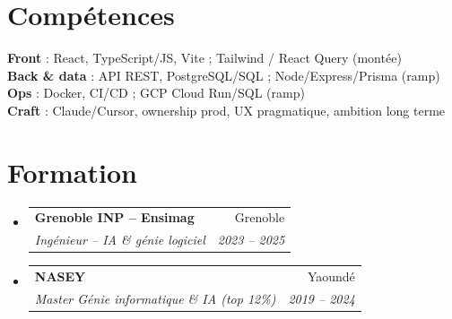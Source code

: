 \documentclass[a4paper,10.5pt]{article}
\makeatletter
\newcommand{\resumeSubheading}[4]{\vspace{2.5pt}\item\begin{tabular*}{0.97\textwidth}[t]{l@{\extracolsep{\fill}}r}\textbf{#1}&{#2}\\\textit{\small #3}&\textit{\small #4}\\\end{tabular*}\vspace{1pt}}
\newcommand{\resumeSubHeadingListStart}{\begin{itemize}[leftmargin=0.08in,label={}]}
\newcommand{\resumeSubHeadingListEnd}{\end{itemize}}
\makeatother
\begin{document}
\section{Comp\'etences}
\begin{itemize}[leftmargin=0.08in,label={}]\small{\item{
\textbf{Front} : React, TypeScript/JS, Vite ; Tailwind / React Query (mont\'ee) \\
\textbf{Back \& data} : API REST, PostgreSQL/SQL ; Node/Express/Prisma (ramp) \\
\textbf{Ops} : Docker, CI/CD ; GCP Cloud Run/SQL (ramp) \\
\textbf{Craft} : Claude/Cursor, ownership prod, UX pragmatique, ambition long terme
}}\end{itemize}

\section{Formation}
\resumeSubHeadingListStart
  \resumeSubheading{Grenoble INP -- Ensimag}{Grenoble}{Ing\'enieur -- IA \& g\'enie logiciel}{2023 -- 2025}
  \resumeSubheading{NASEY}{Yaound\'e}{Master G\'enie informatique \& IA (top 12\%)}{2019 -- 2024}
\resumeSubHeadingListEnd
\end{document}
